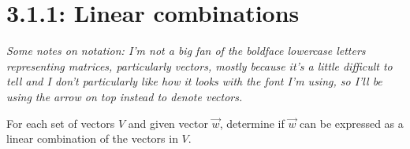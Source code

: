 \documentclass{article}
\begin{document}
\section*{3.1.1: Linear combinations}
\textit{Some notes on notation: I'm not a big fan of the boldface lowercase letters representing matrices, particularly vectors, mostly because it's a little difficult to tell and I don't 
particularly like how it looks with the font I'm using, so I'll be using the arrow on top instead to denote vectors.}\par
\begin{center}
    \colorbox{CornflowerBlue!50}{
    \begin{minipage}[c]{0.9\textwidth}
        \centering
        For each set of vectors \(V\) and given vector \(\overrightarrow{w}\), determine if \(\overrightarrow{w}\) can be expressed as a linear combination of the vectors in \(V\). 
    \end{minipage}
    }
\end{center}
\end{document}
